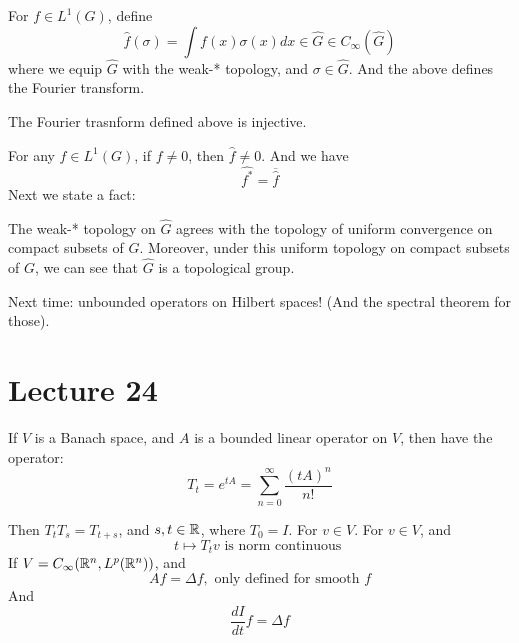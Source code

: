 For $f\in L^1(G)$, define
\begin{equation*}
    \widehat{f}(\sigma)=\int f(x)\sigma(x)dx\in\widehat{G}\in C_\infty(\widehat{G})
\end{equation*}
where we equip $\widehat{G}$ with the weak-* topology, and $\sigma\in\widehat{G}$. And the above defines the Fourier transform.
\begin{corollary}
    The Fourier trasnform defined above is injective.
\end{corollary}
For any $f\in L^1(G)$, if $f\neq 0$, then $\widehat{f}\neq 0$. And we have
\begin{equation*}
    \widehat{f^*}=\overline{\widehat{f}}
\end{equation*}
Next we state a fact: 
\begin{proposition}
    The weak-* topology on $\widehat{G}$ agrees with the topology of uniform convergence on compact subsets of $G$. Moreover, under this uniform topology on compact subsets of $G$, we can see that $\widehat{G}$ is a topological group.
\end{proposition}
Next time: unbounded operators on Hilbert spaces! (And the spectral theorem for those).

\section{Lecture 24}
\begin{definition}
    If $V$ is a Banach space, and $A$ is a bounded linear operator on $V$, then have the operator:
    \begin{equation*}
        T_t=e^{tA}=\sum_{n=0}^\infty\frac{(tA)^n}{n!}
    \end{equation*}
\end{definition}
Then $T_tT_s=T_{t+s}$, and $s,t\in\mathbb{R}$, where $T_0=I$. For $v\in V$. For $v\in V$, and
\begin{equation*}
    t\mapsto T_tv \text{ is norm continuous }
\end{equation*}
If $V=C_\infty(\mathbb{R}^n, L^p(\mathbb{R}^n))$, and
\begin{equation*}
    Af=\Delta f, \text{ only defined for smooth } f
\end{equation*}
And
\begin{equation*}
    \frac{dI}{dt}f=\Delta f 
\end{equation*}

